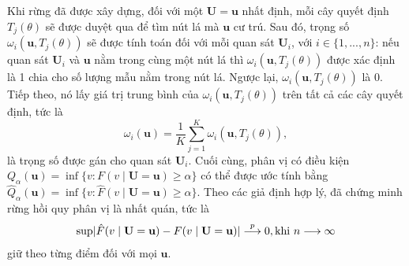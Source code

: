 Khi rừng đã được xây dựng, đối với một $\mathbf{U} = \mathbf{u}$ nhất định, mỗi cây quyết định $T_{j}(\theta)$ sẽ được duyệt qua để tìm nút lá mà $\mathbf{u}$ cư trú. Sau đó, trọng số $\omega_{i}(\mathbf{u},T_{j}(\theta))$ sẽ được tính toán
đối với mỗi quan sát $\mathbf{U}_{i}$, với $i \in \{1,...,n\}$: nếu quan sát $\mathbf{U}_{i}$ và $\mathbf{u}$ nằm trong cùng một nút lá thì $\omega_{i}(\mathbf{u},T_{j}(\theta))$ được xác định là 1 chia cho số lượng mẫu nằm trong nút lá. Ngược lại, $\omega_{i}(\mathbf{u},T_{j}(\theta))$ là $0$. Tiếp theo, nó lấy giá trị trung bình của $\omega_{i}(\mathbf{u},T_{j}(\theta))$ trên tất cả các cây quyết định, tức là
\begin{equation}
\omega_{i}(\mathbf{u}) = \frac{1}{K} \sum_{j=1}^{K}\omega_{i}(\mathbf{u},T_{j}(\theta)),
\label{eq2}
\end{equation}
là trọng số được gán cho quan sát $\mathbf{U}_{i}$. Cuối cùng, phân vị có điều kiện $Q_{\alpha}(\mathbf{u}) = \inf \{v: F(v \mid \mathbf{U}=\mathbf{u}) \geq \alpha\}$ có thể được ước tính bằng $\hat{Q}_{\alpha}(\mathbf{u}) = \inf \{v: \hat{F}(v \mid \mathbf{U}=\mathbf{u}) \geq \alpha\}$. Theo các giả định hợp lý, \cite{meinshausen2006quantile} đã chứng minh rừng hồi quy phân vị là nhất quán, tức là
\begin{equation}
\sup\lvert\hat{F}(v \mid \mathbf{U}=\mathbf{u}) - F(v \mid \mathbf{U}=\mathbf{u})\rvert \stackrel{p}\longrightarrow 0, \textrm{khi } n \longrightarrow \infty
\label{eq3}
\end{equation}
giữ theo từng điểm đối với mọi $\mathbf{u}$.
